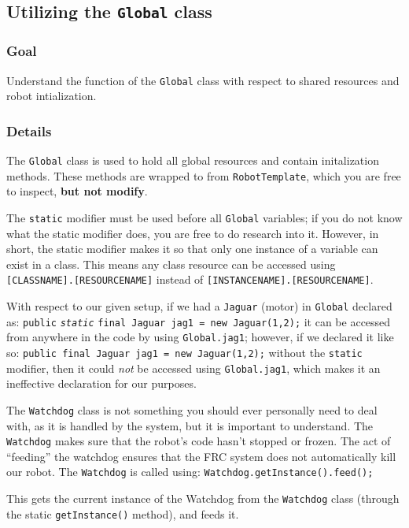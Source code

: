 \documentclass[a4paper]{article}
\begin{document}
\pagebreak\subsection{Utilizing the \lstinline{Global} class}
\subsubsection{Goal} Understand the function of the \lstinline{Global} class with respect to shared resources and robot intialization.
\subsubsection{Details} The \lstinline{Global} class is used to hold all global resources and contain initalization methods. These methods are wrapped to from \lstinline{RobotTemplate}, which you are free to inspect, \textbf{but not modify}.

The \lstinline{static} modifier must be used before all \lstinline{Global} variables; if you do not know what the static modifier does, you are free to do research into it. However, in short, the static modifier makes it so that only one instance of a variable can exist in a class. This means any class resource can be accessed using \lstinline{[CLASSNAME].[RESOURCENAME]} instead of \lstinline{[INSTANCENAME].[RESOURCENAME]}.

With respect to our given setup, if we had a \lstinline{Jaguar} (motor) in \lstinline{Global} declared as: \lstinline{public} \textit{\lstinline{static}} \lstinline{final Jaguar jag1 = new Jaguar(1,2);} it can be accessed from anywhere in the code by using \lstinline{Global.jag1}; however, if we declared it like so: \lstinline{public final Jaguar jag1 = new Jaguar(1,2);} without the \lstinline{static} modifier, then it could \textit{not} be accessed using \lstinline{Global.jag1}, which makes it an ineffective declaration for our purposes.

The \lstinline{Watchdog} class is not something you should ever personally need to deal with, as it is handled by the system, but it is important to understand. The \lstinline{Watchdog} makes sure that the robot's code hasn't stopped or frozen. The act of ``feeding'' the watchdog ensures that the FRC system does not automatically kill our robot. The \lstinline{Watchdog} is called using: \lstinline{Watchdog.getInstance().feed();}

This gets the current instance of the Watchdog from the \lstinline{Watchdog} class (through the static \lstinline{getInstance()} method), and feeds it.
\end{document}
